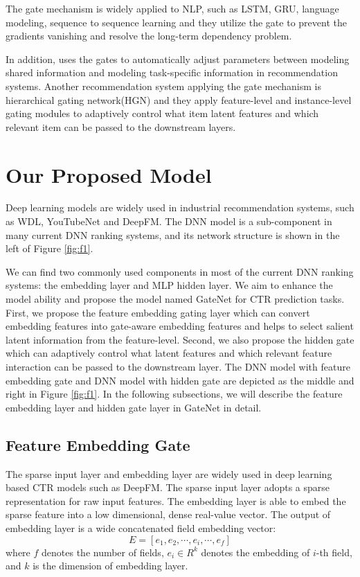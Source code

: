 \documentclass[sigconf,nonacm=true]{acmart}
\begin{document}
The gate mechanism is widely applied to NLP, such as LSTM\cite{gers1999learning}, GRU\cite{cho2014learning}, language modeling\cite{dauphin2017language}, sequence to sequence learning\cite{gehring2017convolutional}
and they utilize the gate to prevent the gradients vanishing and resolve the long-term dependency problem.


In addition, \cite{ma2018modeling} uses the gates to automatically adjust parameters between modeling shared information and modeling task-specific information in recommendation systems. Another recommendation system applying the gate mechanism is hierarchical gating network(HGN)\cite{ma2019hierarchical} and they apply feature-level and instance-level gating
modules to adaptively control what item latent features and which relevant item can be passed to the downstream layers.



\section{Our Proposed Model}
\label{sec:s3}




Deep learning models are widely used in industrial recommendation systems, such as WDL, YouTubeNet\cite{covington2016deep} and DeepFM.
The DNN model is a sub-component in many current DNN ranking systems, and its network structure is shown in the left of Figure \ref{fig:f1}. 


We can find two commonly used components in most of the current DNN ranking systems: the embedding layer and MLP hidden layer. 
We aim to enhance the model ability and propose the model named GateNet for CTR prediction tasks. 
First, we propose the feature embedding gating layer which can convert embedding features into gate-aware embedding features and helps to select salient latent information from the feature-level. 
Second, we also propose the hidden gate which can adaptively control what latent features and which relevant feature interaction can be passed to the downstream layer.
The DNN model with feature embedding gate and DNN model with hidden gate are depicted as the middle and right in Figure \ref{fig:f1}. In the following subsections, we will describe the feature embedding layer and hidden gate layer in GateNet in detail.

\subsection{Feature Embedding Gate}
\label{sec:s31}
The sparse input layer and embedding layer are widely used in deep learning based CTR models such as DeepFM\cite{guo2017deepfm}.
The sparse input layer adopts a sparse representation for raw input features. 
The embedding layer is able to embed the sparse feature into a low dimensional, dense real-value vector. 
The output of embedding layer is a wide concatenated field embedding vector:
$$E=[e_1, e_2, \cdots,e_i, \cdots, e_f]$$
where $f$ denotes the number of fields, $e_i \in R^k$ denotes the embedding of $i$-th field, and $k$ is the dimension of embedding layer.
\end{document}
